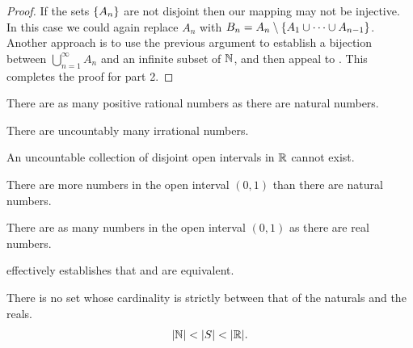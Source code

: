 \documentclass[11pt,twoside=off,numbers=noenddot]{scrbook}
\begin{document}
\begin{proof}
    If the sets $\{ A_n \}$ are not disjoint then our mapping may not be injective. In this case we could again replace $A_n$ with $B_n = A_n \setminus \{ A_1 \cup \dots \cup A_{n - 1} \}$. Another approach is to use the previous argument to establish a bijection between $\bigcup_{n = 1}^{\infty} A_n$ and an infinite subset of $\mathbb N$, and then appeal to . This completes the proof for part 2.
\end{proof}

\begin{theorem}[$\size{\QQ_+} = \size{\NN}$]
    There are as many positive rational numbers as there are natural numbers.
\end{theorem}

\begin{theorem}
    There are uncountably many irrational numbers.
\end{theorem}

\begin{theorem}
    An uncountable collection of disjoint open intervals in $\mathbb R$ cannot exist.
\end{theorem}

\begin{theorem}
    There are more numbers in the open interval $(0, 1)$ than there are natural numbers.
\end{theorem}

\begin{theorem}[$\size{(0, 1)} = \size{\RR}$]
    There are as many numbers in the open interval $(0, 1)$ as there are real numbers.
\end{theorem}

\begin{remark}
     effectively establishes that  and  are equivalent.
\end{remark}

\begin{hypothesis}
    There is no set whose cardinality is strictly between that of the naturals and the reals.
    \begin{align*}
        | \mathbb N | < | S | < | \mathbb R |.
    \end{align*}
\end{hypothesis}
\end{document}
